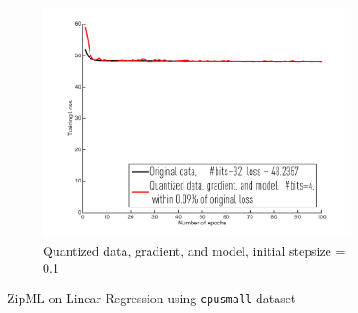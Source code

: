 \documentclass{article}
\begin{document}
\begin{figure}[h]
\begin{subfigure}[h]{.3\columnwidth}
    \includegraphics[width=\columnwidth]{lr/real/cpusmall/dgm01}
     \caption{Quantized data, gradient, and model, initial stepsize = 0.1}
    \end{subfigure}
    
\caption{ZipML on Linear Regression using \texttt{cpusmall} dataset}
\label{fig:lrcpusmall}
\end{figure}
\end{document}

